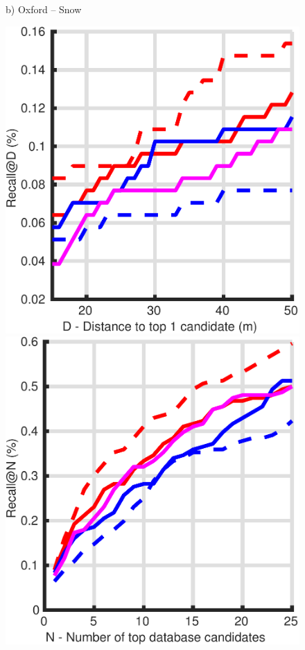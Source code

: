 \begin{figure}
\begin{minipage}{0.27\linewidth}
		b) Oxford -- Snow
	\end{minipage}\hfill
	\begin{minipage}{0.27\linewidth}
		\center \scriptsize
		\includegraphics[width=\linewidth]{plot/oxf_cmu/Results_night_queries/distance}	
		
		\includegraphics[width=\linewidth]{plot/oxf_cmu/Results_night_queries/recall}
		

\end{minipage}
\end{figure}
